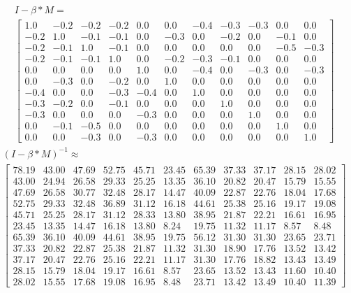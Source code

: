 \begin{gather}
	\nonumber I - \beta * M = \\
	\begin{bmatrix}
		1.0 & -0.2 & -0.2 & -0.2 & 0.0 & 0.0 & -0.4 & -0.3 & -0.3 & 0.0 & 0.0\\
		-0.2 & 1.0 & -0.1 & -0.1 & 0.0 & -0.3 & 0.0 & -0.2 & 0.0 & -0.1 & 0.0\\
		-0.2 & -0.1 & 1.0 & -0.1 & 0.0 & 0.0 & 0.0 & 0.0 & 0.0 & -0.5 & -0.3\\
		-0.2 & -0.1 & -0.1 & 1.0 & 0.0 & -0.2 & -0.3 & -0.1 & 0.0 & 0.0 & 0.0\\
		0.0 & 0.0 & 0.0 & 0.0 & 1.0 & 0.0 & -0.4 & 0.0 & -0.3 & 0.0 & -0.3\\
		0.0 & -0.3 & 0.0 & -0.2 & 0.0 & 1.0 & 0.0 & 0.0 & 0.0 & 0.0 & 0.0\\
		-0.4 & 0.0 & 0.0 & -0.3 & -0.4 & 0.0 & 1.0 & 0.0 & 0.0 & 0.0 & 0.0\\
		-0.3 & -0.2 & 0.0 & -0.1 & 0.0 & 0.0 & 0.0 & 1.0 & 0.0 & 0.0 & 0.0\\
		-0.3 & 0.0 & 0.0 & 0.0 & -0.3 & 0.0 & 0.0 & 0.0 & 1.0 & 0.0 & 0.0\\
		0.0 & -0.1 & -0.5 & 0.0 & 0.0 & 0.0 & 0.0 & 0.0 & 0.0 & 1.0 & 0.0\\
		0.0 & 0.0 & -0.3 & 0.0 & -0.3 & 0.0 & 0.0 & 0.0 & 0.0 & 0.0 & 1.0
	\end{bmatrix}
	\label{frml:katzZentralitaetPseudoMitarbeiter:formel3}
\end{gather}
\begin{gather}
	\nonumber (I - \beta * M)^{-1} \approx\\
	\begin{bmatrix}
		78.19 & 43.00 & 47.69 & 52.75 & 45.71 & 23.45 & 65.39 & 37.33 & 37.17 & 28.15 & 28.02\\
		43.00 & 24.94 & 26.58 & 29.33 & 25.25 & 13.35 & 36.10 & 20.82 & 20.47 & 15.79 & 15.55\\
		47.69 & 26.58 & 30.77 & 32.48 & 28.17 & 14.47 & 40.09 & 22.87 & 22.76 & 18.04 & 17.68\\
		52.75 & 29.33 & 32.48 & 36.89 & 31.12 & 16.18 & 44.61 & 25.38 & 25.16 & 19.17 & 19.08\\
		45.71 & 25.25 & 28.17 & 31.12 & 28.33 & 13.80 & 38.95 & 21.87 & 22.21 & 16.61 & 16.95\\
		23.45 & 13.35 & 14.47 & 16.18 & 13.80 & 8.24 & 19.75 & 11.32 & 11.17 & 8.57 & 8.48\\
		65.39 & 36.10 & 40.09 & 44.61 & 38.95 & 19.75 & 56.12 & 31.30 & 31.30 & 23.65 & 23.71\\
		37.33 & 20.82 & 22.87 & 25.38 & 21.87 & 11.32 & 31.30 & 18.90 & 17.76 & 13.52 & 13.42\\
		37.17 & 20.47 & 22.76 & 25.16 & 22.21 & 11.17 & 31.30 & 17.76 & 18.82 & 13.43 & 13.49\\
		28.15 & 15.79 & 18.04 & 19.17 & 16.61 & 8.57 & 23.65 & 13.52 & 13.43 & 11.60 & 10.40\\
		28.02 & 15.55 & 17.68 & 19.08 & 16.95 & 8.48 & 23.71 & 13.42 & 13.49 & 10.40 & 11.39
	\end{bmatrix}
	\label{frml:katzZentralitaetPseudoMitarbeiter:formel4}
\end{gather}
